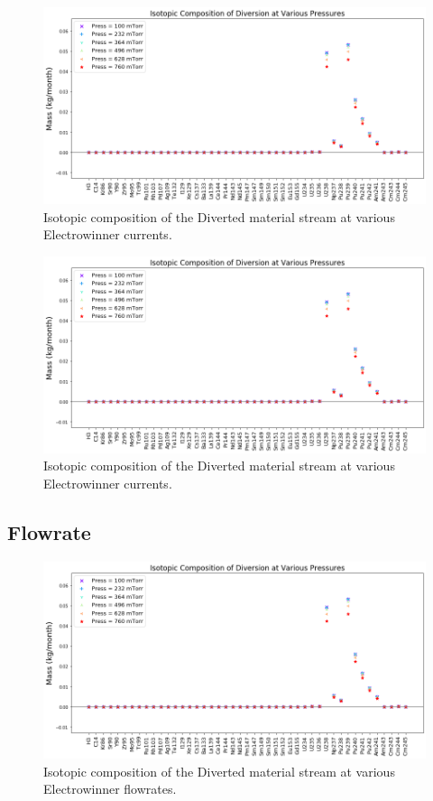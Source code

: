 \begin{figure}
	\includegraphics[width=\linewidth]{images/pressure-sa-comp}
	\caption{Isotopic composition of the Diverted material stream at various Electrowinner currents.}
	\label{fig:win-cur-sa}
\end{figure}

\begin{figure}
	\includegraphics[width=\linewidth]{images/pressure-sa-comp}
	\caption{Isotopic composition of the Diverted material stream at various Electrowinner currents.}
	\label{fig:win-cur-diff}
\end{figure}

\subsection{Flowrate}

\begin{figure}
	\includegraphics[width=\linewidth]{images/pressure-sa-comp}
	\caption{Isotopic composition of the Diverted material stream at various Electrowinner flowrates.}
	\label{fig:win-flow-sa}
\end{figure}


